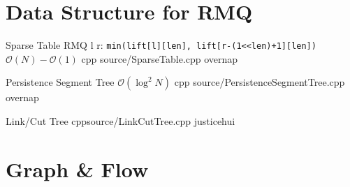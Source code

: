 \documentclass[landscape, 10pt, a4paper, oneside, twocolumn]{extarticle}
\begin{document}
\maketitlepage



\section{Data Structure for RMQ}


\Algorithm
{Sparse Table}
{RMQ l r: \texttt{min(lift[l][len], lift[r-(1<<len)+1][len])}}
{$\mathcal{O}(N)-\mathcal{O}(1)$}
{cpp}
{source/SparseTable.cpp}
{overnap}



\Algorithm
{Persistence Segment Tree}
{}
{$\mathcal{O}(\log^2{N})$}
{cpp}
{source/PersistenceSegmentTree.cpp}
{overnap}






\Algorithm
{Link/Cut Tree}
{}
{}
{cpp}{source/LinkCutTree.cpp}
{justicehui}


\section{Graph \& Flow}
\end{document}
